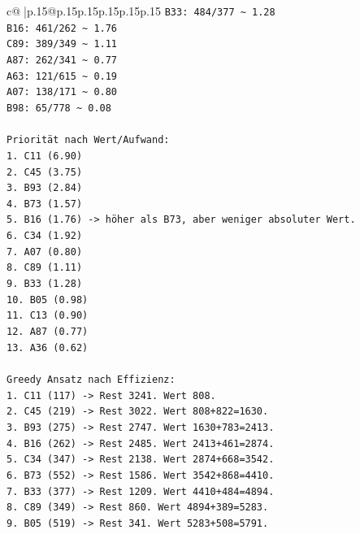 \documentclass{article}
\begin{document}
{\begin{supertabular}{c@{$\;$}|p{.15\linewidth}@{}p{.15\linewidth}p{.15\linewidth}p{.15\linewidth}p{.15\linewidth}p{.15\linewidth}}
{{{\texttt{B33: 484/377 \textasciitilde{} 1.28} \\
\texttt{B16: 461/262 \textasciitilde{} 1.76} \\
\texttt{C89: 389/349 \textasciitilde{} 1.11} \\
\texttt{A87: 262/341 \textasciitilde{} 0.77} \\
\texttt{A63: 121/615 \textasciitilde{} 0.19} \\
\texttt{A07: 138/171 \textasciitilde{} 0.80} \\
\texttt{B98: 65/778 \textasciitilde{} 0.08} \\
\\ 
\texttt{Priorität nach Wert/Aufwand:} \\
\texttt{1. C11 (6.90)} \\
\texttt{2. C45 (3.75)} \\
\texttt{3. B93 (2.84)} \\
\texttt{4. B73 (1.57)} \\
\texttt{5. B16 (1.76) {-}> höher als B73, aber weniger absoluter Wert.} \\
\texttt{6. C34 (1.92)} \\
\texttt{7. A07 (0.80)} \\
\texttt{8. C89 (1.11)} \\
\texttt{9. B33 (1.28)} \\
\texttt{10. B05 (0.98)} \\
\texttt{11. C13 (0.90)} \\
\texttt{12. A87 (0.77)} \\
\texttt{13. A36 (0.62)} \\
\\ 
\texttt{Greedy Ansatz nach Effizienz:} \\
\texttt{1. C11 (117) {-}> Rest 3241. Wert 808.} \\
\texttt{2. C45 (219) {-}> Rest 3022. Wert 808+822=1630.} \\
\texttt{3. B93 (275) {-}> Rest 2747. Wert 1630+783=2413.} \\
\texttt{4. B16 (262) {-}> Rest 2485. Wert 2413+461=2874.} \\
\texttt{5. C34 (347) {-}> Rest 2138. Wert 2874+668=3542.} \\
\texttt{6. B73 (552) {-}> Rest 1586. Wert 3542+868=4410.} \\
\texttt{7. B33 (377) {-}> Rest 1209. Wert 4410+484=4894.} \\
\texttt{8. C89 (349) {-}> Rest 860. Wert 4894+389=5283.} \\
\texttt{9. B05 (519) {-}> Rest 341. Wert 5283+508=5791.} \\
}}}
\end{supertabular}}
\end{document}

